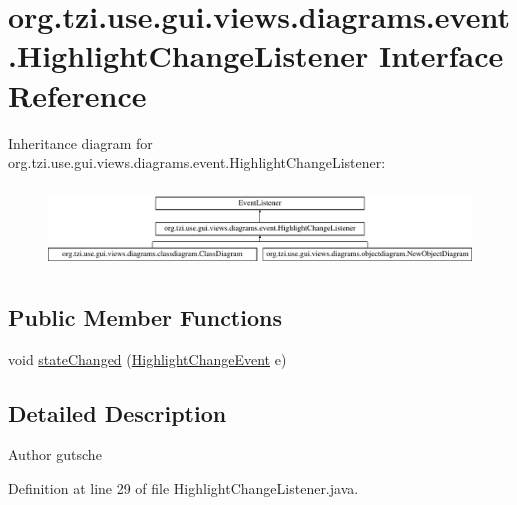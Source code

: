\hypertarget{interfaceorg_1_1tzi_1_1use_1_1gui_1_1views_1_1diagrams_1_1event_1_1_highlight_change_listener}{\section{org.\-tzi.\-use.\-gui.\-views.\-diagrams.\-event.\-Highlight\-Change\-Listener Interface Reference}
\label{interfaceorg_1_1tzi_1_1use_1_1gui_1_1views_1_1diagrams_1_1event_1_1_highlight_change_listener}
}
Inheritance diagram for org.\-tzi.\-use.\-gui.\-views.\-diagrams.\-event.\-Highlight\-Change\-Listener\-:\begin{figure}[H]
\begin{center}
\leavevmode
\includegraphics[height=2.170543cm]{interfaceorg_1_1tzi_1_1use_1_1gui_1_1views_1_1diagrams_1_1event_1_1_highlight_change_listener}
\end{center}
\end{figure}
\subsection*{Public Member Functions}
\begin{DoxyCompactItemize}
\item 
void \hyperlink{interfaceorg_1_1tzi_1_1use_1_1gui_1_1views_1_1diagrams_1_1event_1_1_highlight_change_listener_ad6fc7614342d2e545092637f3a1143fb}{state\-Changed} (\hyperlink{classorg_1_1tzi_1_1use_1_1gui_1_1views_1_1diagrams_1_1event_1_1_highlight_change_event}{Highlight\-Change\-Event} e)
\end{DoxyCompactItemize}


\subsection{Detailed Description}
\begin{DoxyAuthor}{Author}
gutsche 
\end{DoxyAuthor}


Definition at line 29 of file Highlight\-Change\-Listener.\-java.



